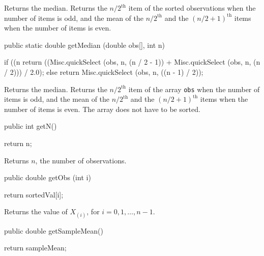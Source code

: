 \begin{tabb}
   Returns the median.
   Returns the $n/2^{\mbox{th}}$ item of the sorted observations when the number
   of items is odd, and the mean of the $n/2^{\mbox{th}}$ and the
   $(n/2 + 1)^{\mbox{th}}$ items when the number of items is even.
\end{tabb}
\begin{code}

   public static double getMedian (double obs[], int n)\begin{hide} {
      if ((n %
         return ((Misc.quickSelect (obs, n, (n / 2 - 1)) +
                  Misc.quickSelect (obs, n, (n / 2))) / 2.0);
      else
         return Misc.quickSelect (obs, n, ((n - 1) / 2));
   }\end{hide}
\end{code}
\begin{tabb}
  Returns the median.
   Returns the $n/2^{\mbox{th}}$ item of the array \texttt{obs} when the number
   of items is odd, and the mean of the $n/2^{\mbox{th}}$ and the
   $(n/2 + 1)^{\mbox{th}}$ items when the number of items is even.
   The array does not have to be sorted.
\end{tabb}
\begin{htmlonly}
\end{htmlonly}
\begin{code}

   public int getN()\begin{hide} {
      return n;
   }\end{hide}
\end{code}
\begin{tabb}   Returns $n$, the number of observations.
\end{tabb}
\begin{code}

   public double getObs (int i)\begin{hide} {
      return sortedVal[i];
   }\end{hide}
\end{code}
\begin{tabb}   Returns the value of $X_{(i)}$, for $i=0, 1, \ldots, n-1$.
\end{tabb}
\begin{code}

   public double getSampleMean()\begin{hide} {
      return sampleMean;
   }\end{hide}
\end{code}
